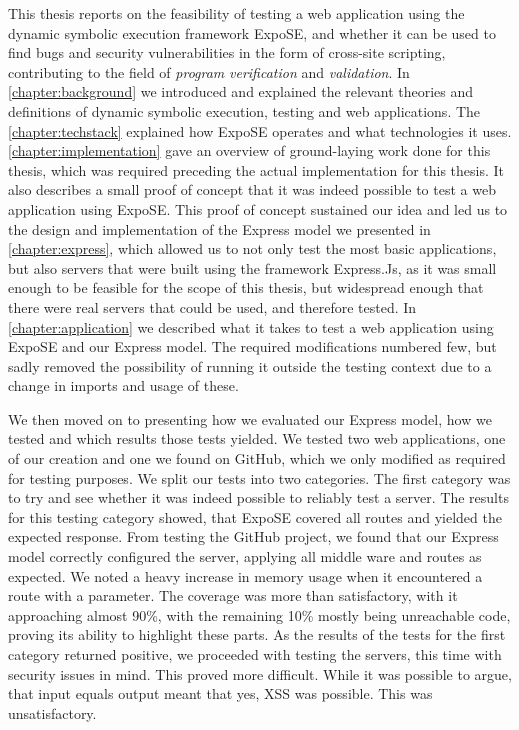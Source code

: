 This thesis reports on the feasibility of testing a web application using the dynamic symbolic execution framework ExpoSE, 
and whether it can be used to find bugs and security vulnerabilities in the form of cross-site scripting, 
contributing to the field of \textit{program} \textit{verification} and \textit{validation}.
In \autoref{chapter:background} we introduced and explained the relevant theories and definitions of dynamic symbolic execution, testing and web applications.
The \autoref{chapter:techstack} explained how ExpoSE operates and what technologies it uses.
\autoref{chapter:implementation} gave an overview of ground-laying work done for this thesis, which was required preceding the actual implementation for this thesis.
It also describes a small proof of concept that it was indeed possible to test a web application using ExpoSE. 
This proof of concept sustained our idea and led us to the design and implementation of the Express model we presented in \autoref{chapter:express}, which allowed us to not only test the most basic applications,
but also servers that were built using the framework Express.Js, as it was small enough to be feasible for the scope of this thesis, but widespread enough that 
there were real servers that could be used, and therefore tested. In \autoref{chapter:application} we described what it takes to test a web application using ExpoSE and our Express model. The required modifications numbered few, but sadly removed the possibility of running it outside the testing context due to a change in imports and usage of these.


We then moved on to presenting how we evaluated our Express model, how we tested and which results those tests yielded. We tested two web applications, one of our creation and one we found on GitHub, which we only modified as required for testing purposes. We split our tests into two categories. The first category was to try and see whether it was indeed possible to reliably test a server. 
The results for this testing category showed, that ExpoSE covered all routes and yielded the expected response. From testing the GitHub project, we found that our Express model correctly configured the server, applying all middle ware and routes as expected.
We noted a heavy increase in memory usage when it encountered a route with a parameter. The coverage was more than satisfactory, with it approaching almost 90\%, with the remaining 10\% mostly being unreachable code, proving its ability to highlight these parts.
As the results of the tests for the first category returned positive, we proceeded with testing the servers, this time with security issues in mind. This proved more difficult. While it was possible to argue, that input equals output meant that yes, XSS was possible. This was unsatisfactory. 



